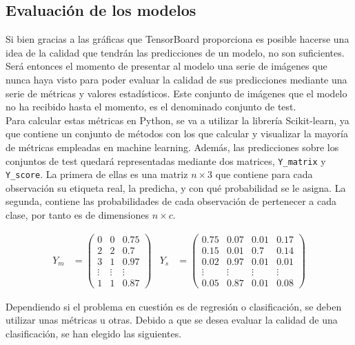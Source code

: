 		\subsection{Evaluación de los modelos}
		
			Si bien gracias a las gráficas que TensorBoard proporciona es posible hacerse una idea de la calidad que tendrán las predicciones de un modelo, no son suficientes. Será entonces el momento de presentar al modelo una serie de imágenes que nunca haya visto para poder evaluar la calidad de sus predicciones mediante una serie de métricas y valores estadísticos. Este conjunto de imágenes que el modelo no ha recibido hasta el momento, es el denominado conjunto de test. \\
			
			Para calcular estas métricas en Python, se va a utilizar la librería Scikit-learn, ya que contiene un conjunto de métodos con los que calcular y visualizar la mayoría de métricas empleadas en machine learning. Además, las predicciones sobre los conjuntos de test quedará representadas mediante dos matrices, \texttt{Y\_matrix} y \texttt{Y\_score}. La primera de ellas es una matriz $n \times 3$ que contiene para cada observación su etiqueta real, la predicha, y con qué probabilidad se le asigna. La segunda, contiene las probabilidades de cada observación de pertenecer a cada clase, por tanto es de dimensiones $n \times c$. 
			
			\begin{align*}
				Y_m &= \begin{pmatrix}
					0 & 0 & 0.75\\
					2 & 2 & 0.7\\
					3 & 1 & 0.97\\
					\vdots & \vdots & \vdots\\
					1 & 1 & 0.87
				\end{pmatrix} & 
				Y_s &= \begin{pmatrix}
					0.75 & 0.07 & 0.01 & 0.17\\
					0.15 & 0.01 & 0.7 & 0.14\\
					0.02 & 0.97 & 0.01 & 0.01\\
					\vdots & \vdots & \vdots & \vdots\\
					0.05 & 0.87 & 0.01 & 0.08
				\end{pmatrix}
			\end{align*}
			
			Dependiendo si el problema en cuestión es de regresión o clasificación, se deben utilizar unas métricas u otras. Debido a que se desea evaluar la calidad de una clasificación, se han elegido las siguientes. 
			
